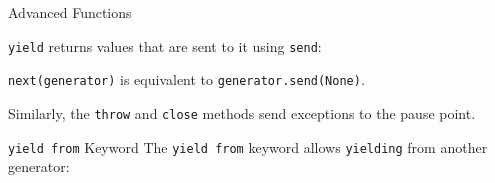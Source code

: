   \begin{frame}{Advanced Functions}
  
  \texttt{yield} returns values that are sent to it using \texttt{send}:
  
  
  \texttt{next(generator)} is equivalent to \texttt{generator.send(None)}.
  
  Similarly, the \texttt{throw} and \texttt{close} methods send exceptions to the pause point.
  \end{frame}
  
  \begin{frame}{\texttt{yield from} Keyword}
  The \texttt{yield from} keyword allows \texttt{yielding} from another generator:
  
  \end{frame}